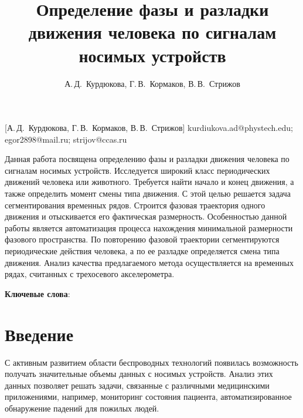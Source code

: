 \documentclass[12pt, twoside]{article}
\begin{document}
\title
    [] %
    {Определение фазы и разладки движения человека по сигналам носимых устройств}
\author
    [А.\,Д.~Курдюкова] %
    {А.\,Д.~Курдюкова, Г.\,В.~Кормаков, В.\,В.~Стрижов} %
    [А.\,Д.~Курдюкова, Г.\,В.~Кормаков, В.\,В.~Стрижов] %
\email
   {kurdiukova.ad@phystech.edu; egor2898@mail.ru; strijov@ccas.ru}
\abstract
  {Данная работа посвящена определению фазы и разладки движения человека по сигналам носимых устройств. Исследуется широкий класс периодических движений человека или животного. Требуется найти начало и конец движения, а также определить момент смены типа движения. С этой целью решается задача сегментирования временных рядов. Строится фазовая траектория одного движения и отыскивается его фактическая размерность. Особенностью данной работы является автоматизация процесса нахождения минимальной размерности фазового пространства. По повторению фазовой траектории сегментируются периодические действия человека, а по ее разладке определяется смена типа движения. Анализ качества предлагаемого метода осуществляется на временных рядах, считанных с трехосевого акселерометра.

\bigskip
\noindent
\textbf{Ключевые слова}: \emph {}
}

\doi{}
\receivedRus{}
\receivedEng{}

\maketitle
\linenumbers

\section{Введение}
С активным развитием области беспроводных технологий появилась возможность получать значительные объемы данных с носимых устройств. Анализ этих данных позволяет решать задачи, связанные с различными медицинскими приложениями, например, мониторинг состояния пациента, автоматизированное обнаружение падений для пожилых людей.
\end{document}
